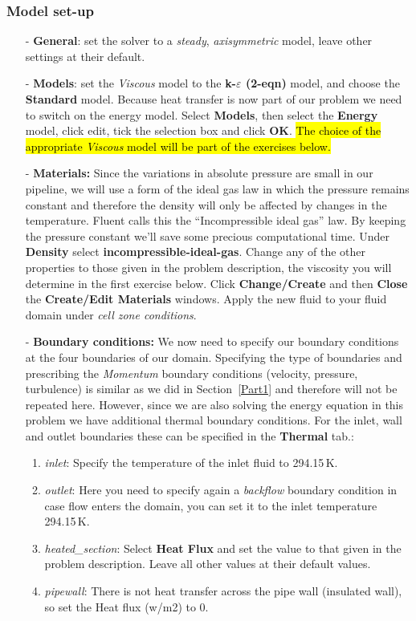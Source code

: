 \documentclass[11pt,a4paper,oneside]{scrartcl}
\newcommand\bfr[1]{\textcolor[rgb]{1,0.00,0.00}{\textbf{\textsf{#1}}}}
\begin{document}
\subsubsection*{Model set-up}

\begin{itemize}
    \item[-] \textbf{General}: set the solver to a \emph{steady}, \emph{axisymmetric} model, leave other settings at their default.
    \item[-] \textbf{Models}: set the \emph{Viscous} model to the \bfr{k-$\varepsilon$ (2-eqn)} model, and choose the \bfr{Standard} model. Because heat transfer is now part of our problem we need to switch on the energy model. Select \bfr{Models}, then select the \bfr{Energy} model, click edit, tick the selection box and click \bfr{OK}. \hl{The choice of the appropriate \emph{Viscous} model will be part of the exercises below.}

    \item[-] \textbf{Materials:} Since the variations in absolute pressure are small in our pipeline, we will use a form of the ideal gas law in which the pressure remains constant and therefore the density will only be affected by changes in the temperature. Fluent calls this the ``Incompressible ideal gas'' law. By keeping the pressure constant we'll save some precious computational time. Under \bfr{Density} select \bfr{incompressible-ideal-gas}. Change any of the other properties to those given in the problem description, the viscosity you will determine in the first exercise below. Click \bfr{Change/Create} and then \bfr{Close} the \bfr{Create/Edit Materials} windows. Apply the new fluid to your fluid domain under \emph{cell zone conditions}.
    \item[-] \textbf{Boundary conditions:} We now need to specify our boundary conditions at the four boundaries of our domain. Specifying the type of boundaries and prescribing the \emph{Momentum} boundary conditions (velocity, pressure, turbulence) is similar as we did in Section~\ref{Part1} and therefore will not be repeated here. However, since we are also solving the energy equation in this problem we have additional thermal boundary conditions. For the inlet, wall and outlet boundaries these can be specified in the \bfr{Thermal} tab.:
    \begin{enumerate}
    \item \emph{inlet}: Specify the temperature of the inlet fluid to 294.15\,K.
    \item \emph{outlet}: Here you need to specify again a \emph{backflow} boundary condition in case flow enters the domain, you can set it to the inlet temperature 294.15\,K.
    \item \emph{heated\_section}: Select \bfr{Heat Flux} and set the value to that given in the problem description. Leave all other values at their default values.
    \item \emph{pipewall}: There is not heat transfer across the pipe wall (insulated wall), so set the Heat flux (w/m2) to 0.
    \end{enumerate}


\end{itemize}
\end{document}
